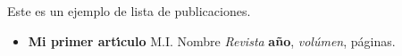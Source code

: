 
Este es un ejemplo de lista de publicaciones.


\begin{itemize}
  \item \textbf{Mi primer art\'{\i}culo}
    \newline M.I. Nombre
    \newline \emph{Revista} \textbf{a\~{n}o}, \emph{vol\'{u}men}, p\'{a}ginas.
\end{itemize}
